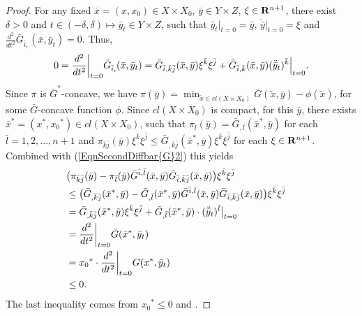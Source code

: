 \begin{proof}
		For any fixed $\bar{x} = (x, x_0) \in X \times X_0$, $\bar{y} \in Y\times Z$, $\xi \in {\mathbf R}^{n+1}$, there exist $\delta >0$ and $t \in (-\delta, \delta) \longmapsto \bar{y}_t \in Y\times Z$, such that $\bar{y}_t|_{t=0} =\bar{y}$,  $\dot{\bar{y}}|_{t=0} = \xi$ and $\frac{d^2}{dt^2} \bar{G}_{\bar{i}, }(\bar{x}, \bar{y}_t) = 0$. Thus, 
		\begin{equation}\label{EqnSecondDiffbar{G}2}
		0 = \frac{d^2}{dt^2}\bigg|_{t=0}\bar{G}_{\bar{i},}(\bar{x}, \bar{y}_t) = \bar{G}_{\bar{i}, \bar{k}\bar{j}}(\bar{x}, \bar{y}) \xi^{\bar{k}}\xi^{\bar{j}} + \bar{G}_{\bar{i}, \bar{k}}(\bar{x}, \bar{y}) (\ddot{\bar{y}}_t)^{\bar{k}}\Big|_{t=0}.
		\end{equation}
		Since $\pi$ is $\bar{G}^*$-concave, we have $\pi(\bar{y}) =\min_{\tilde{x} \in cl(X \times X_0)} \bar{G}(\tilde{x}, \bar{y}) - \phi(\tilde{x})$, for some $\bar{G}$-concave function $\phi$. Since $cl(X \times X_0)$ is compact, for this $\bar{y}$, there exists ${\bar{x}}^* = ({x}^*, {x_0}^*) \in cl(X \times X_0)$, such that 
		$\pi_{\bar{l}}(\bar{y}) = \bar{G}_{,\bar{l}}({\bar{x}}^*, \bar{y})$ for each $\bar{l} = 1, 2,..., n+1$ and $\pi_{\bar{k}\bar{j}}(\bar{y})\xi^{\bar{k}}\xi^{\bar{j}} \le \bar{G}_{,\bar{k}\bar{j}}({\bar{x}^*}, \bar{y})\xi^{\bar{k}}\xi^{\bar{j}}$  for each $\xi \in {\mathbf R}^{n+1}$. 
		Combined with (\ref{EqnSecondDiffbar{G}2}) this yields
		\begin{align*}\label{Eqn:proofcor}
		\begin{split}
		&\big(\pi_{\bar{k}\bar{j}}(\bar{y})- \pi_{\bar{l}}(\bar{y}) \bar{G}^{\bar i,\bar l}(\bar{x}, \bar{y})\bar{G}_{\bar{i},\bar{k}\bar{j}}(\bar{x}, \bar{y})\big)\xi^{\bar{k}}\xi^{\bar{j}} \\
		&\le
		\big(\bar{G}_{,\bar{k}\bar{j}}({\bar{x}}^*, \bar{y})- \bar{G}_{,\bar{l}}({\bar{x}}^*, \bar{y})\bar{G}^{\bar i,\bar l}(\bar{x}, \bar{y})\bar{G}_{\bar{i},\bar{k}\bar{j}}(\bar{x}, \bar{y})\big)\xi^{\bar{k}}\xi^{\bar{j}} \\
		&= \bar{G}_{,\bar{k}\bar{j}}({\bar{x}}^*, \bar{y})\xi^{\bar{k}}\xi^{\bar{j}}+ \bar{G}_{,\bar{l}}({\bar{x}}^*, \bar{y})\cdot (\ddot{\bar{y}}_t)^{\bar{l}}\big|_{t=0}\\
		& = \frac{d^2}{dt^2}\bigg|_{t=0} \bar{G}({\bar{x}}^*, \bar{y}_t) \hspace{5.33cm}\\
		& = {x_0}^* \cdot\frac{d^2}{dt^2}\bigg|_{t=0} G({x}^*, \bar{y}_t) \\
		&\le 0.
		\end{split}
		\end{align*}
		The last inequality comes from ${x_0}^* \le 0$ and \Gthree.
	\end{proof}
	
